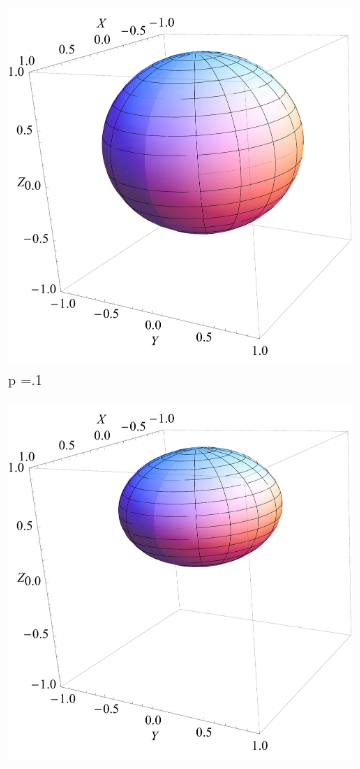 \documentclass[letterpaper,twoside,10pt]{article}
\begin{document}
\begin{figure}[H]%
\centering
	\begin{subfigure}{.3\textwidth}
		\includegraphics[width=\columnwidth,natwidth=600,natheight=600]{./AmplitudeDamping/ADPoint2.pdf}%
		\caption{p =.1}%
	\end{subfigure}
	\begin{subfigure}{.3\textwidth}
		\includegraphics[width=\columnwidth,natwidth=600,natheight=600]{./AmplitudeDamping/ADPoint5.pdf}%

\end{subfigure}
\end{figure}
\end{document}
